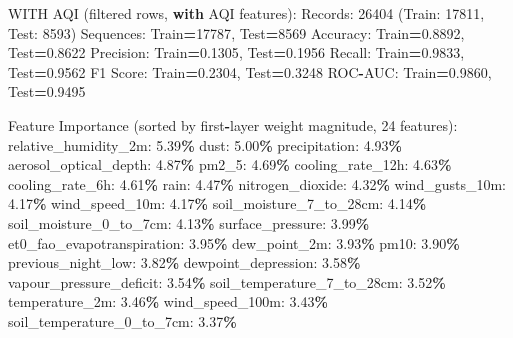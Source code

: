 \documentclass[
  letterpaper,
  DIV=11,
  numbers=noendperiod]{scrartcl}
\newenvironment{Shaded}{\begin{snugshade}}{\end{snugshade}}
\newcommand{\BuiltInTok}[1]{#1}
\newcommand{\ControlFlowTok}[1]{\textcolor[rgb]{0.13,0.29,0.53}{\textbf{#1}}}
\newcommand{\DecValTok}[1]{\textcolor[rgb]{0.00,0.00,0.81}{#1}}
\newcommand{\FloatTok}[1]{\textcolor[rgb]{0.00,0.00,0.81}{#1}}
\newcommand{\NormalTok}[1]{#1}
\newcommand{\OperatorTok}[1]{\textcolor[rgb]{0.81,0.36,0.00}{\textbf{#1}}}
\begin{document}
\begin{Shaded}
\begin{Highlighting}[]
\NormalTok{WITH AQI (filtered rows, }\ControlFlowTok{with}\NormalTok{ AQI features):}
\NormalTok{  Records: }\DecValTok{26404}\NormalTok{ (Train: }\DecValTok{17811}\NormalTok{, Test: }\DecValTok{8593}\NormalTok{)}
\NormalTok{  Sequences: Train}\OperatorTok{=}\DecValTok{17787}\NormalTok{, Test}\OperatorTok{=}\DecValTok{8569}
\NormalTok{  Accuracy: Train}\OperatorTok{=}\FloatTok{0.8892}\NormalTok{, Test}\OperatorTok{=}\FloatTok{0.8622}
\NormalTok{  Precision: Train}\OperatorTok{=}\FloatTok{0.1305}\NormalTok{, Test}\OperatorTok{=}\FloatTok{0.1956}
\NormalTok{  Recall: Train}\OperatorTok{=}\FloatTok{0.9833}\NormalTok{, Test}\OperatorTok{=}\FloatTok{0.9562}
\NormalTok{  F1 Score: Train}\OperatorTok{=}\FloatTok{0.2304}\NormalTok{, Test}\OperatorTok{=}\FloatTok{0.3248}
\NormalTok{  ROC}\OperatorTok{{-}}\NormalTok{AUC: Train}\OperatorTok{=}\FloatTok{0.9860}\NormalTok{, Test}\OperatorTok{=}\FloatTok{0.9495}

\NormalTok{  Feature Importance (}\BuiltInTok{sorted}\NormalTok{ by first}\OperatorTok{{-}}\NormalTok{layer weight magnitude, }\DecValTok{24}\NormalTok{ features):}
\NormalTok{    relative\_humidity\_2m: }\FloatTok{5.39}\OperatorTok{\%}
\NormalTok{    dust: }\FloatTok{5.00}\OperatorTok{\%}
\NormalTok{    precipitation: }\FloatTok{4.93}\OperatorTok{\%}
\NormalTok{    aerosol\_optical\_depth: }\FloatTok{4.87}\OperatorTok{\%}
\NormalTok{    pm2\_5: }\FloatTok{4.69}\OperatorTok{\%}
\NormalTok{    cooling\_rate\_12h: }\FloatTok{4.63}\OperatorTok{\%}
\NormalTok{    cooling\_rate\_6h: }\FloatTok{4.61}\OperatorTok{\%}
\NormalTok{    rain: }\FloatTok{4.47}\OperatorTok{\%}
\NormalTok{    nitrogen\_dioxide: }\FloatTok{4.32}\OperatorTok{\%}
\NormalTok{    wind\_gusts\_10m: }\FloatTok{4.17}\OperatorTok{\%}
\NormalTok{    wind\_speed\_10m: }\FloatTok{4.17}\OperatorTok{\%}
\NormalTok{    soil\_moisture\_7\_to\_28cm: }\FloatTok{4.14}\OperatorTok{\%}
\NormalTok{    soil\_moisture\_0\_to\_7cm: }\FloatTok{4.13}\OperatorTok{\%}
\NormalTok{    surface\_pressure: }\FloatTok{3.99}\OperatorTok{\%}
\NormalTok{    et0\_fao\_evapotranspiration: }\FloatTok{3.95}\OperatorTok{\%}
\NormalTok{    dew\_point\_2m: }\FloatTok{3.93}\OperatorTok{\%}
\NormalTok{    pm10: }\FloatTok{3.90}\OperatorTok{\%}
\NormalTok{    previous\_night\_low: }\FloatTok{3.82}\OperatorTok{\%}
\NormalTok{    dewpoint\_depression: }\FloatTok{3.58}\OperatorTok{\%}
\NormalTok{    vapour\_pressure\_deficit: }\FloatTok{3.54}\OperatorTok{\%}
\NormalTok{    soil\_temperature\_7\_to\_28cm: }\FloatTok{3.52}\OperatorTok{\%}
\NormalTok{    temperature\_2m: }\FloatTok{3.46}\OperatorTok{\%}
\NormalTok{    wind\_speed\_100m: }\FloatTok{3.43}\OperatorTok{\%}
\NormalTok{    soil\_temperature\_0\_to\_7cm: }\FloatTok{3.37}\OperatorTok{\%}


\end{Highlighting}
\end{Shaded}
\end{document}
